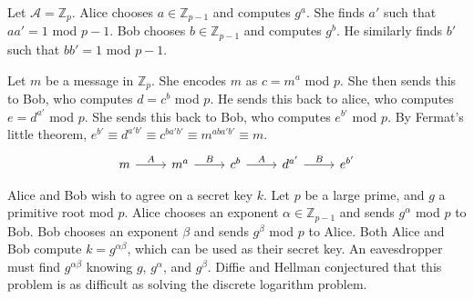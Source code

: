 \begin{example}
    Let \( \mathcal A = \mathbb Z_p \).
    Alice chooses \( a \in \mathbb Z_{p-1} \) and computes \( g^a \).
    She finds \( a' \) such that \( aa' = 1 \) mod \( p-1 \).
    Bob chooses \( b \in \mathbb Z_{p-1} \) and computes \( g^b \).
    He similarly finds \( b' \) such that \( bb' = 1 \) mod \( p-1 \).

    Let \( m \) be a message in \( \mathbb Z_p \).
    She encodes \( m \) as \( c = m^a \) mod \( p \).
    She then sends this to Bob, who computes \( d = c^b \) mod \( p \).
    He sends this back to alice, who computes \( e = d^{a'} \) mod \( p \).
    She sends this back to Bob, who computes \( e^{b'} \) mod \( p \).
    By Fermat's little theorem, \( e^{b'} \equiv d^{a'b'} \equiv c^{ba'b'} \equiv m^{aba'b'} \equiv m \).
    \[\begin{tikzcd}
        m & {m^a} & {c^b} & {d^{a'}} & {e^{b'}}
        \arrow["A", from=1-1, to=1-2]
        \arrow["B", from=1-2, to=1-3]
        \arrow["A", from=1-3, to=1-4]
        \arrow["B", from=1-4, to=1-5]
    \end{tikzcd}\]
\end{example}
\begin{example}
    Alice and Bob wish to agree on a secret key \( k \).
    Let \( p \) be a large prime, and \( g \) a primitive root mod \( p \).
    Alice chooses an exponent \( \alpha \in \mathbb Z_{p-1} \) and sends \( g^\alpha \) mod \( p \) to Bob.
    Bob chooses an exponent \( \beta \) and sends \( g^\beta \) mod \( p \) to Alice.
    Both Alice and Bob compute \( k = g^{\alpha\beta} \), which can be used as their secret key.
    An eavesdropper must find \( g^{\alpha\beta} \) knowing \( g \), \( g^{\alpha} \), and \( g^{\beta} \).
    Diffie and Hellman conjectured that this problem is as difficult as solving the discrete logarithm problem.
\end{example}

